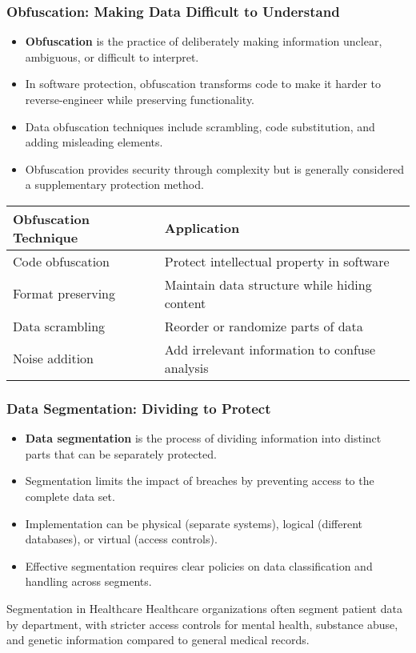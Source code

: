\documentclass{beamer}
\begin{document}
\begin{frame}
\frametitle{Obfuscation: Making Data Difficult to Understand}
\begin{itemize}
    \item \textbf{Obfuscation} is the practice of deliberately making information unclear, ambiguous, or difficult to interpret.
    \item In software protection, obfuscation transforms code to make it harder to reverse-engineer while preserving functionality.
    \item Data obfuscation techniques include scrambling, code substitution, and adding misleading elements.
    \item Obfuscation provides security through complexity but is generally considered a supplementary protection method.
\end{itemize}

\begin{table}
\begin{tabular}{|l|l|}
\hline
\textbf{Obfuscation Technique} & \textbf{Application} \\
\hline
Code obfuscation & Protect intellectual property in software \\
\hline
Format preserving & Maintain data structure while hiding content \\
\hline
Data scrambling & Reorder or randomize parts of data \\
\hline
Noise addition & Add irrelevant information to confuse analysis \\
\hline
\end{tabular}
\end{table}
\end{frame}

\begin{frame}
    \frametitle{Data Segmentation: Dividing to Protect}
    \begin{itemize}
        \item \textbf{Data segmentation} is the process of dividing information into distinct parts that can be separately protected.
        \item Segmentation limits the impact of breaches by preventing access to the complete data set.
        \item Implementation can be physical (separate systems), logical (different databases), or virtual (access controls).
        \item Effective segmentation requires clear policies on data classification and handling across segments.
    \end{itemize}
    
    \begin{exampleblock}{Segmentation in Healthcare}
    Healthcare organizations often segment patient data by department, with stricter access controls for mental health, substance abuse, and genetic information compared to general medical records.
    \end{exampleblock}
    \end{frame}
    
\end{document}
